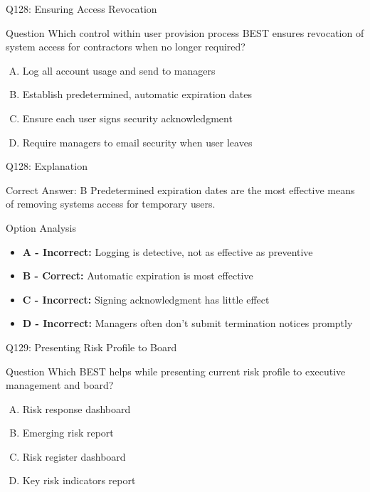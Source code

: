 \documentclass{beamer}
\begin{document}
	\begin{frame}{Q128: Ensuring Access Revocation}
		\begin{block}{Question}
			Which control within user provision process BEST ensures revocation of system access for contractors when no longer required?
		\end{block}
		\begin{enumerate}[(A)]
			\item Log all account usage and send to managers
			\item Establish predetermined, automatic expiration dates
			\item Ensure each user signs security acknowledgment
			\item Require managers to email security when user leaves
		\end{enumerate}
	\end{frame}
	
	\begin{frame}{Q128: Explanation}
		\begin{block}{Correct Answer: B}
			Predetermined expiration dates are the most effective means of removing systems access for temporary users.
		\end{block}
		\begin{block}{Option Analysis}
			\begin{itemize}
				\item \textbf{A - Incorrect:} Logging is detective, not as effective as preventive
				\item \textbf{B - Correct:} Automatic expiration is most effective
				\item \textbf{C - Incorrect:} Signing acknowledgment has little effect
				\item \textbf{D - Incorrect:} Managers often don't submit termination notices promptly
			\end{itemize}
		\end{block}
	\end{frame}
	
	\begin{frame}{Q129: Presenting Risk Profile to Board}
		\begin{block}{Question}
			Which BEST helps while presenting current risk profile to executive management and board?
		\end{block}
		\begin{enumerate}[(A)]
			\item Risk response dashboard
			\item Emerging risk report
			\item Risk register dashboard
			\item Key risk indicators report
		\end{enumerate}
	\end{frame}
	
\end{document}
